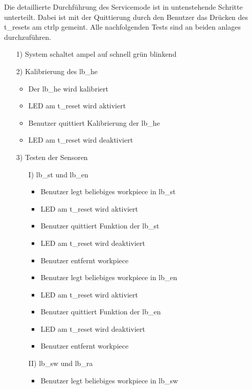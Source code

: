 Die detaillierte Durchführung des Servicemode ist in untenstehende Schritte unterteilt. Dabei ist mit der Quittierung
durch den Benutzer das Drücken des \gls{t_reset}s am \gls{ctrlp} gemeint. Alle nachfolgenden Tests sind an beiden
\glspl{anlage} durchzuführen.
\begin{enumerate}
    \item[1)] System schaltet \gls{ampel} auf schnell grün blinkend
    \item[2)] Kalibrierung des \gls{lb_he}
    \begin{itemize}
        \item Der \gls{lb_he} wird kalibriert
        \item LED am \gls{t_reset} wird aktiviert
        \item Benutzer quittiert Kalibrierung der \gls{lb_he}
        \item LED am \gls{t_reset} wird deaktiviert
    \end{itemize}
    \item[3)] Testen der Sensoren
    \begin{enumerate}
        \item[I)] \Gls{lb_st} und \gls{lb_en}
        \begin{itemize}
            \item Benutzer legt beliebiges \gls{workpiece} in \gls{lb_st}
            \item LED am \gls{t_reset} wird aktiviert
            \item Benutzer quittiert Funktion der \gls{lb_st}
            \item LED am \gls{t_reset} wird deaktiviert
            \item Benutzer entfernt \gls{workpiece}
            \item Benutzer legt beliebiges \gls{workpiece} in \gls{lb_en}
            \item LED am \gls{t_reset} wird aktiviert
            \item Benutzer quittiert Funktion der \gls{lb_en}
            \item LED am \gls{t_reset} wird deaktiviert
            \item Benutzer entfernt \gls{workpiece}
        \end{itemize}
        \item[II)] \Gls{lb_sw} und \gls{lb_ra}
        \begin{itemize}
            \item Benutzer legt beliebiges \gls{workpiece} in \gls{lb_sw}

\end{itemize}
\end{enumerate}
\end{enumerate}
